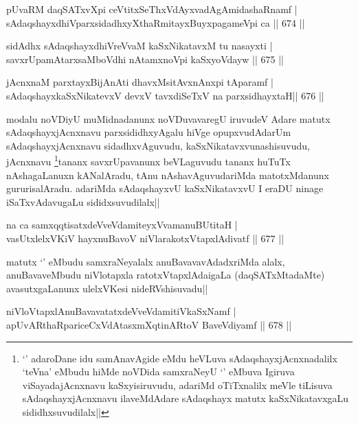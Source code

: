 \begin{shl}
pUvaRM daqSATxvX\s pi ceVtitxSeThxVdAyxvadAgAmidashaRnamf | \\
sAdaqshayxdhiVparxsidadhxyXthaRmitayxBuyxpagameV\s pi ca \hfill||  674 ||  
\end{shl}
				
\begin{shl}
sidAdhx sAdaqshayxdhiVreVvaM kaSxNikatavxM tu nasayxti | \\
savxrUpamAtarxsaMboVdhi nA\s \s tamxnoV\s pi kaSxyoVdayw \hfill||  675 ||  
\end{shl}

\begin{shl}
jAcnxnaM parxtayxBijAnAti dhavxMsitAvxnAnxpi tAparamf | \\
sAdaqshayxkaSxNikatevxV devxV tavxdiSeTxV na parxsidhayxtaH\hfill ||  676 ||  
\end{shl}

\begin{artha}
modalu noVDiyU muMidnadanunx noVDuvavaregU iruvudeV Adare matutx sAdaqshayxjAcnxnavu parxsididhxyAgalu hiVge opupxvudAdarUm sAdaqshayxjAcnxnavu sidadhxvAguvudu, kaSxNikatavxvunashisuvudu, jAcnxnavu \footnote{`\stext' adaroDane idu samAnavAgide eMdu heVLuva sAdaqshayxjAcnxnadalilx  `teVna' eMbudu hiMde noVDida samxraNeyU `\stext' eMbuva Igiruva viSayadajAcnxnavu kaSxyisiruvudu, adariMd oTiTxnalilx meVle tiLisuva sAdaqshayxjAcnxnavu ilaveMdAdare sAdaqshayx matutx kaSxNikatavxgaLu sididhxsuvudilalx||}tananx savxrUpavanunx beVLaguvudu tananx huTuTx nAshagaLanuxn kANalAradu, tAnu nAshavAguvudariMda matotxMdanunx gururisalAradu. adariMda sAdaqshayxvU kaSxNikatavxvU I eraDU ninage iSaTxvAdavugaLu sididxsuvudilalx||
\end{artha}

\begin{shl}
na ca samxqqtisatxdeVveVdamiteyxVvamanuBUtitaH | \\
vasUtxlelxVKiV hayxnuBavoV niVlarakotxVtapxlAdivatf \hfill||  677 ||  
\end{shl}

\begin{artha}
matutx `\stext' eMbudu samxraNeyalalx anuBavavavAdadxriMda alalx, anuBavaveMbudu niVlotapxla ratotxVtapxlAdaigaLa (daqSATxMtadaMte) avasutxgaLanunx ulelxVKesi nideRVshisuvadu||
\end{artha}

\begin{shl}
niVloVtapxlAnuBavavatatxdeVveVdamitiVkaSxNamf | \\
apUvARthaRpariceCxVdAtasxmXqtinARtoV BaveVdiyamf \hfill||  678 ||  
\end{shl}

